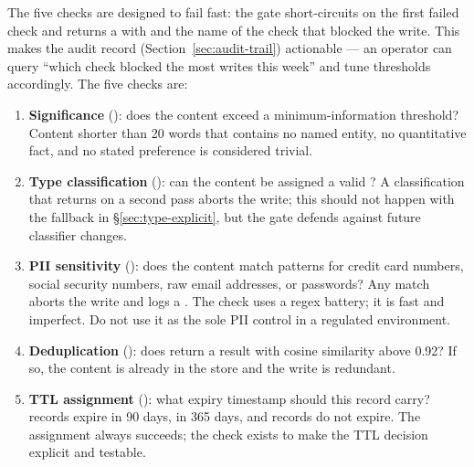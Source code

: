 The five checks are designed to fail fast: the gate short-circuits on the
first failed check and returns a  with 
and the name of the check that blocked the write. This makes the audit record
(Section~\ref{sec:audit-trail}) actionable --- an operator can query
``which check blocked the most writes this week'' and tune thresholds
accordingly. The five checks are:

\begin{enumerate}
    \item \textbf{Significance} (): does the content
    exceed a minimum-information threshold? Content shorter than 20 words that
    contains no named entity, no quantitative fact, and no stated preference
    is considered trivial.

    \item \textbf{Type classification} (): can
    the content be assigned a valid ? A classification that
    returns  on a second pass aborts the write; this should not
    happen with the fallback in \S\ref{sec:type-explicit}, but the gate
    defends against future classifier changes.

    \item \textbf{PII sensitivity} (): does the content
    match patterns for credit card numbers, social security numbers, raw email
    addresses, or passwords? Any match aborts the write and logs a
    . The check uses a regex battery; it is fast and
    imperfect. Do not use it as the sole PII control in a regulated
    environment.

    \item \textbf{Deduplication} (): does
     return a
    result with cosine similarity above 0.92? If so, the content is already in
    the store and the write is redundant.

    \item \textbf{TTL assignment} (): what expiry timestamp
    should this record carry?  records expire in 90 days,
     in 365 days, and  records do not expire.
    The assignment always succeeds; the check exists to make the TTL decision
    explicit and testable.
\end{enumerate}

